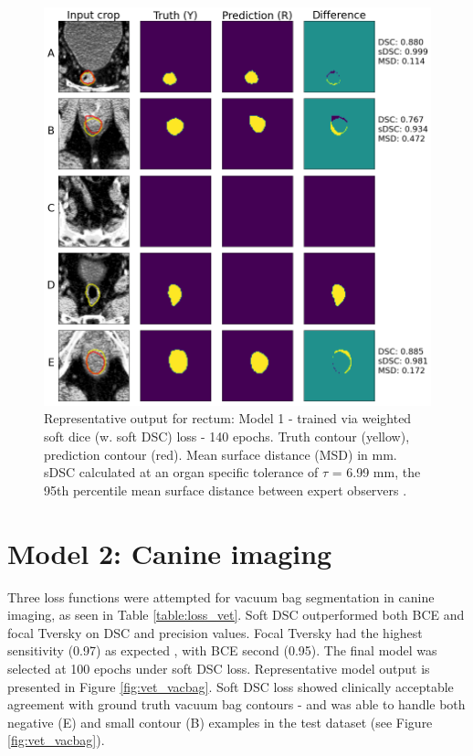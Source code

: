 \begin{figure}[H]
	\begin{center}
		\includegraphics[width=1.0\textwidth]{figures/prostate_rectum}
		\caption{Representative output for rectum: Model 1 - trained via weighted
      soft dice (w. soft DSC) loss - 140 epochs. Truth contour (yellow),
      prediction contour (red). Mean surface distance (MSD) in mm. sDSC
      \cite{Nikolov_2018} calculated at an organ specific tolerance of $\tau$ =
      6.99 mm, the 95th percentile mean surface distance between expert
      observers \cite{Roach_2019}.}
		\label{fig:prostate_rectum}
	\end{center}
\end{figure}

\section{Model 2: Canine imaging}

Three loss functions were attempted for vacuum bag segmentation in canine
imaging, as seen in Table \ref{table:loss_vet}. Soft DSC outperformed both BCE
and focal Tversky on DSC and precision values. Focal Tversky had the highest
sensitivity (0.97) as expected \cite{Khan2019}, with BCE second (0.95). The
final model was selected at 100 epochs under soft DSC loss. Representative model
output is presented in Figure \ref{fig:vet_vacbag}. Soft DSC loss showed
clinically acceptable agreement with ground truth vacuum bag contours - and was
able to handle both negative (E) and small contour (B) examples in the test
dataset (see Figure \ref{fig:vet_vacbag}).

